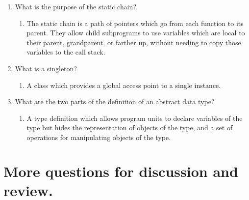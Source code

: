 \begin{enumerate}
\begin{answer}
    \end{answer}
  \item What is the purpose of the static chain?


    \begin{answer}

    \begin{enumerate}
    \item The static chain is a path of pointers which go from each
      function to its parent.  They allow child subprograms to use
      variables which are local to their parent, grandparent, or
      farther up, without needing to copy those variables to the call
      stack.
 
    \end{enumerate}

    \end{answer}
  \item What is a singleton?

  
    \begin{answer}

    \begin{enumerate}
    \item A class which provides a global access point to a single instance.  
    \end{enumerate}

    \end{answer}

  \item What are the two parts of the definition 
    of an abstract data type?

    \begin{answer}

    \begin{enumerate}
    \item A type definition which allows program units to declare
      variables of the type but hides the representation of objects of
      the type, and a set of operations for manipulating objects of
      the type.
 
    \end{enumerate}

    \end{answer}

  \end{enumerate}



\section{More questions for discussion and review.}

